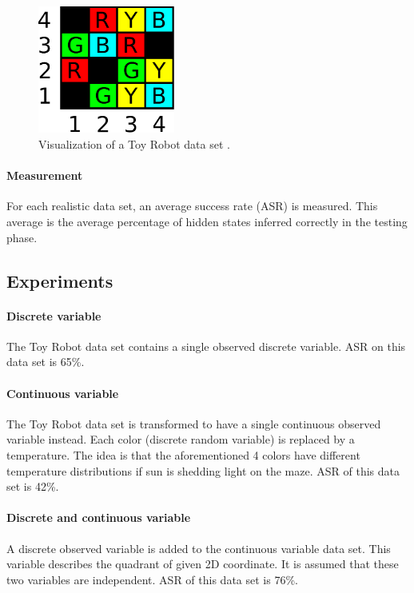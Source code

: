 \documentclass[thesis=B,english]{FITthesis}[2012/06/26]
\begin{document}
\begin{figure}
	\centering
 	\includegraphics[width=0.4\textwidth]{robot_maze}
 	\caption{Visualization of a Toy Robot data set \cite{robot-maze}.}
 	\label{fig:robot_maze}
\end{figure}

\paragraph{Measurement}
For each realistic data set, an average success rate (ASR) is measured. This average is the average percentage of hidden states inferred correctly in the testing phase.

\subsection{Experiments}

\paragraph{Discrete variable}
The Toy Robot data set contains a single observed discrete variable. ASR on this data set is 65\%.

\paragraph{Continuous variable}
The Toy Robot data set is transformed to have a single continuous observed variable instead. Each color (discrete random variable) is replaced by a temperature. The idea is that the aforementioned 4 colors have different temperature distributions if sun is shedding light on the maze. ASR of this data set is 42\%.

\paragraph{Discrete and continuous variable}
A discrete observed variable is added to the continuous variable data set. This variable describes the quadrant of given 2D coordinate. It is assumed that these two variables are independent. ASR of this data set is 76\%.
\end{document}
